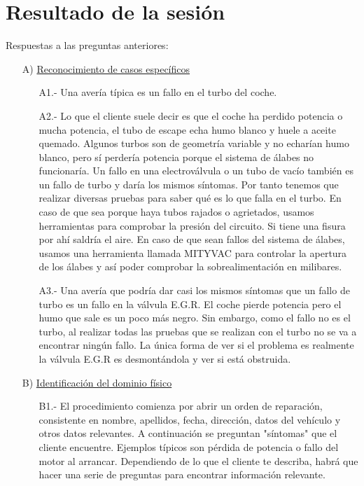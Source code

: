\documentclass[a4paper,12pt]{article}
\begin{document}
\section{Resultado de la sesión}
 Respuestas a las preguntas anteriores:
 \begin{itemize}
 \item[A)] \underline{Reconocimiento de casos específicos}
 \begin{itemize}
 \item[A1.-] Una avería típica es un fallo en el turbo del coche. 
 \item[A2.-] Lo que el cliente suele decir es que el coche ha perdido potencia o mucha potencia, el tubo de escape echa humo blanco y huele a aceite quemado. Algunos turbos son de geometría variable y no echarían humo blanco, pero sí perdería potencia porque el sistema de álabes no funcionaría. Un fallo en una electroválvula o un tubo de vacío también es un fallo de turbo y daría los mismos síntomas. Por tanto tenemos que realizar diversas pruebas para saber qué es lo que falla en el turbo. En caso de que sea porque haya tubos rajados o agrietados, usamos herramientas para comprobar la presión del circuito. Si tiene una fisura por ahí saldría el aire. En caso de que sean fallos del sistema de álabes, usamos una herramienta llamada MITYVAC para controlar la apertura de los álabes y así poder comprobar la sobrealimentación en milibares.
 \item[A3.-] Una avería que podría dar casi los mismos síntomas que un fallo de turbo es un fallo en la válvula E.G.R. El coche pierde potencia pero el humo que sale es un poco más negro. Sin embargo, como el fallo no es el turbo, al realizar todas las pruebas que se realizan con el turbo no se va a encontrar ningún fallo. La única forma de ver si el problema es realmente la válvula E.G.R es desmontándola y ver si está obstruida.
 \end{itemize}
 \item[B)] \underline{Identificación del dominio físico}
\begin{itemize}
 \item[B1.-] El procedimiento comienza por abrir un orden de reparación, consistente en nombre, apellidos, fecha, dirección, datos del vehículo y otros datos relevantes. A continuación se preguntan "síntomas" que el cliente encuentre. Ejemplos típicos son pérdida de potencia o fallo del motor al arrancar. Dependiendo de lo que el cliente te describa, habrá que hacer una serie de preguntas para encontrar información relevante.

\end{itemize}
\end{itemize}
\end{document}
